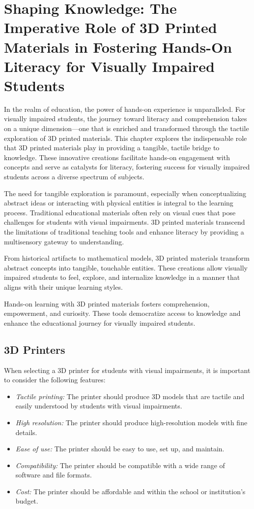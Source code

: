 \chapter{Shaping Knowledge: The Imperative Role of 3D Printed Materials in Fostering Hands-On Literacy for Visually Impaired Students}\label{d-printers}

In the realm of education, the power of hands-on experience is unparalleled. For visually impaired students, the journey toward literacy and comprehension takes on a unique dimension—one that is enriched and transformed through the tactile exploration of 3D printed materials. This chapter explores the indispensable role that 3D printed materials play in providing a tangible, tactile bridge to knowledge. These innovative creations facilitate hands-on engagement with concepts and serve as catalysts for literacy, fostering success for visually impaired students across a diverse spectrum of subjects.

The need for tangible exploration is paramount, especially when conceptualizing abstract ideas or interacting with physical entities is integral to the learning process. Traditional educational materials often rely on visual cues that pose challenges for students with visual impairments. 3D printed materials transcend the limitations of traditional teaching tools and enhance literacy by providing a multisensory gateway to understanding.

From historical artifacts to mathematical models, 3D printed materials transform abstract concepts into tangible, touchable entities. These creations allow visually impaired students to feel, explore, and internalize knowledge in a manner that aligns with their unique learning styles.

Hands-on learning with 3D printed materials fosters comprehension, empowerment, and curiosity. These tools democratize access to knowledge and enhance the educational journey for visually impaired students.

\section{3D Printers}\label{d-print-equipment}
When selecting a 3D printer for students with visual impairments, it is important to consider the following features:

\begin{itemize}
    \item \emph{Tactile printing:} The printer should produce 3D models that are tactile and easily understood by students with visual impairments.
    \item \emph{High resolution:} The printer should produce high-resolution models with fine details.
    \item \emph{Ease of use:} The printer should be easy to use, set up, and maintain.
    \item \emph{Compatibility:} The printer should be compatible with a wide range of software and file formats.
    \item \emph{Cost:} The printer should be affordable and within the school or institution's budget.
\end{itemize}

